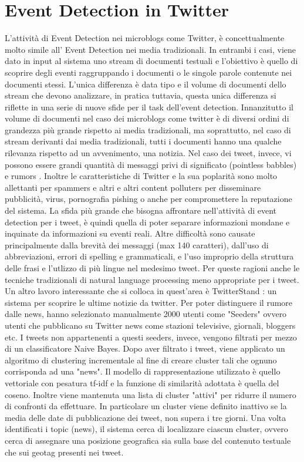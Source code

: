 \section{Event Detection in Twitter}
L'attività di Event Detection nei microblogs come Twitter, è concettualmente molto simile all' Event Detection nei media tradizionali. In entrambi i casi, viene dato in input al sistema  uno stream di documenti testuali e l'obiettivo è quello di scoprire degli eventi raggruppando i documenti o le singole parole contenute nei documenti stessi. L'unica differenza è data tipo e il volume di documenti dello stream che devono analizzare, in pratica tuttavia, questa unica differenza si riflette in una serie di nuove sfide per il task dell'event detection. 
Innanzitutto il volume di documenti nel caso dei microblogs come twitter  è di diversi ordini di grandezza più grande rispetto ai media tradizionali, ma soprattutto, nel caso di stream derivanti dai media tradizionali, tutti i documenti hanno una qualche rilevanza rispetto ad un avvenimento, una notizia. Nel caso dei tweet, invece, vi possono essere grandi quantità di messaggi privi di significato (pointless babbles) \cite{DBLP:conf/icwsm/HurlockW11} e rumors \cite{Castillo:2011:ICT:1963405.1963500}. Inoltre le caratteristiche di Twitter e la sua poplarità sono molto allettanti per spammers e altri e altri content polluters \cite{DBLP:conf/icwsm/LeeEC11} per disseminare pubblicità, virus, pornografia pishing o anche per compromettere la reputazione del sistema. La sfida più grande che bisogna affrontare nell'attività di event detection per i tweet, è quindi quella di poter separare informazioni mondane e inquinate da informazioni su eventi reali. Altre difficoltà sono causate principalmente dalla brevità dei messaggi (max 140 caratteri), dall'uso di abbreviazioni, errori di spelling e grammaticali, e l'uso improprio della struttura delle frasi e l'utlizzo di più lingue nel medesimo tweet. Per queste ragioni anche le tecniche tradizionali di natural language processing  meno appropriate per i tweet. Un altro lavoro interessante che si colloca in quest'area è TwitterStand \cite{Sankaranarayanan:2009:TNT:1653771.1653781}: un sistema per scoprire le ultime  notizie da twitter. Per poter distinguere il rumore dalle news, hanno selezionato manualmente 2000 utenti come "Seeders" ovvero utenti che pubblicano su Twitter news come stazioni televisive, giornali, bloggers etc. I tweets non appartenenti a questi seeders, invece, vengono filtrati per mezzo di un classificatore Naive Bayes. Dopo aver filtrato i tweet, viene applicato un algoritmo di clustering incrementale al fine di creare cluster tali che ognuno corrisponda ad una "news". Il modello di rappresentazione utilizzato è quello vettoriale con pesatura tf-idf e la funzione di similarità adottata è quella del coseno.  Inoltre viene mantenuta una lista di cluster "attivi" per ridurre il numero di confronti da effettuare. In particolare un cluster viene definito inattivo se la media delle date di pubblicazione dei tweet, non supera i tre giorni. Una volta identificati i topic (news), il sistema cerca di localizzare ciascun cluster, ovvero cerca di assegnare una posizione geografica sia sulla base del contenuto testuale che sui geotag presenti nei tweet.
